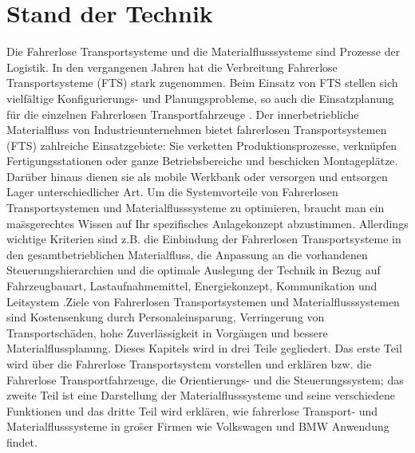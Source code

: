 \section{Stand der Technik}
Die Fahrerlose Transportsysteme und die Materialflusssysteme sind Prozesse der Logistik. In den vergangenen Jahren hat die Verbreitung Fahrerlose Transportsysteme (FTS) stark zugenommen. Beim Einsatz von FTS stellen sich vielf\"{a}ltige Konfigurierungs- und Planungsprobleme, so auch die Einsatzplanung f\"ur die einzelnen Fahrerlosen Transportfahrzeuge \cite[S.2]{Guenther;Krueger:2000}. Der innerbetriebliche Materialfluss von Industrieunternehmen bietet fahrerlosen Transportsystemen (FTS) zahlreiche Einsatzgebiete: Sie verketten Produktionsprozesse, verknüpfen Fertigungsstationen oder ganze Betriebsbereiche und beschicken Montagepl\"{a}tze. Darüber hinaus dienen sie als mobile Werkbank oder versorgen und entsorgen Lager unterschiedlicher Art. Um die Systemvorteile von Fahrerlosen Transportsystemen und Materialflusssysteme zu optimieren, braucht man ein ma\"ssgerechtes Wissen auf Ihr spezifisches Anlagekonzept abzustimmen. Allerdings wichtige Kriterien sind z.B. die Einbindung der Fahrerlosen Transportsysteme in den gesamtbetrieblichen Materialfluss, die Anpassung an die vorhandenen Steuerungshierarchien und die optimale Auslegung der Technik in Bezug auf Fahrzeugbauart, Lastaufnahmemittel, Energiekonzept, Kommunikation und Leitsystem \cite{Werner:2014:Online}.Ziele von Fahrerlosen Transportsystemen und Materialflusssystemen sind Kostensenkung durch Personaleinsparung, Verringerung von Transportsch\"aden, hohe Zuverl\"assigkeit in Vorg\"angen und bessere Materialflussplanung.
Dieses Kapitels wird in drei Teile gegliedert. Das erste Teil wird \"uber die Fahrerlose Transportsystem vorstellen und erkl\"aren bzw. die Fahrerlose Transportfahrzeuge, die Orientierungs- und die Steuerungssystem; das zweite Teil ist eine Darstellung der Materialflusssysteme und seine verschiedene Funktionen und das dritte Teil wird erkl\"aren, wie fahrerlose Transport- und Materialflusssysteme in gro\"ser Firmen wie Volkswagen und BMW Anwendung findet.

